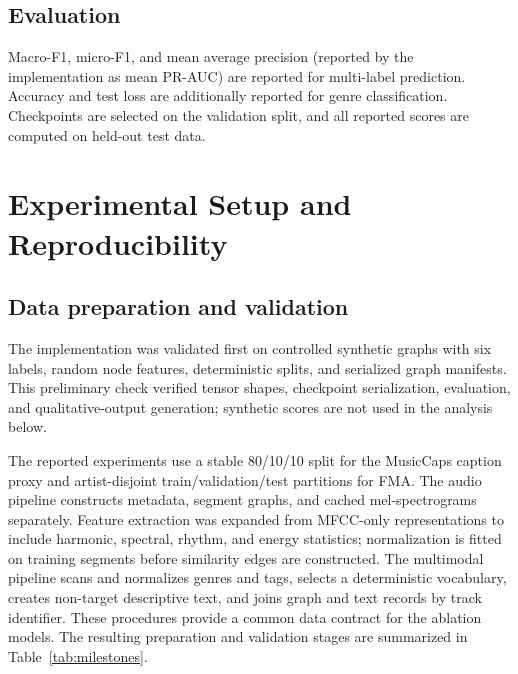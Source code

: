 \documentclass[conference]{IEEEtran}
\begin{document}
\subsection{Evaluation}
Macro-F1, micro-F1, and mean average precision (reported by the
implementation as mean PR-AUC) are reported for multi-label prediction.
Accuracy and test loss are additionally reported for genre classification.
Checkpoints are selected on the validation split, and all reported scores
are computed on held-out test data.

\section{Experimental Setup and Reproducibility}
\subsection{Data preparation and validation}
The implementation was validated first on controlled synthetic graphs with
six labels, random node features, deterministic splits, and serialized graph
manifests. This preliminary check verified tensor shapes, checkpoint
serialization, evaluation, and qualitative-output generation; synthetic
scores are not used in the analysis below.

The reported experiments use a stable 80/10/10 split for the MusicCaps
caption proxy and artist-disjoint train/validation/test partitions for FMA.
The audio pipeline constructs metadata, segment graphs, and cached
mel-spectrograms separately. Feature extraction was expanded from MFCC-only
representations to include harmonic, spectral, rhythm, and energy
statistics; normalization is fitted on training segments before similarity
edges are constructed. The multimodal pipeline scans and normalizes genres
and tags, selects a deterministic vocabulary, creates non-target descriptive
text, and joins graph and text records by track identifier. These procedures
provide a common data contract for the ablation models.
The resulting preparation and validation stages are summarized in
Table~\ref{tab:milestones}.
\end{document}
